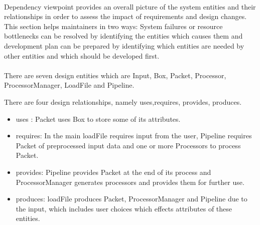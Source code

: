 \paragraph{}
\normalsize

Dependency viewpoint provides an overall picture of the system entities and their relationships in order to assess the impact of requirements and design changes. This section helps maintainers in two ways: System failures or resource bottlenecks can be resolved by identifying the entities which causes them and development plan can be prepared by identifying which entities are needed by other entities and which should be developed first. 

\paragraph{}
\normalsize
There are seven design entities which are Input, Box, Packet, Processor, ProcessorManager, LoadFile and Pipeline.
    
There are four design relationships, namely  uses,requires, provides, produces.
\begin{itemize}
\item	uses : Packet uses Box to store some of its attributes.
\item    requires: In the main loadFile requires input from the user, Pipeline requires Packet of preprocessed input data and one or more Processors to process Packet.
\item    provides: Pipeline provides Packet at the end of its process and ProcessorManager generates processors and provides them for further use.
\item  	produces: loadFile produces Packet, ProcessorManager and Pipeline due to the input, which includes user choices which effects attributes of these entities.
\end{itemize}


